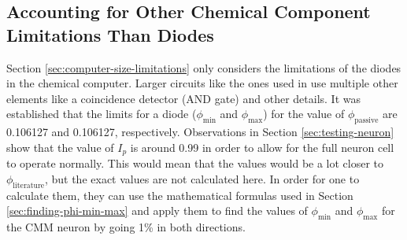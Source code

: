 \subsection{Accounting for Other Chemical Component Limitations Than Diodes} \label{sec:other-components}
Section \ref{sec:computer-size-limitations} only considers the limitations of the diodes in the chemical computer.
Larger circuits like the ones used in \cite{stovold2017reaction} use multiple other elements like a coincidence detector (AND gate) and other details.
It was established that the limits for a diode ($\phi_{\text{min}}$ and $\phi_{\text{max}}$) for the value of $\phi_{\text{passive}}$ are 0.106127
and 0.106127, respectively. 
Observations in Section \ref{sec:testing-neuron} show that the value of $I_p$ is around 0.99 in order to allow for the full neuron cell to operate normally.
This would mean that the values would be a lot closer to $\phi_{\text{literature}}$, but the exact values are not calculated here. 
In order for one to calculate them, they can use the mathematical formulas used in Section \ref{sec:finding-phi-min-max} and apply them to find the values of $\phi_{\text{min}}$ and $\phi_{\text{max}}$ for the CMM neuron
by going 1\% in both directions.

